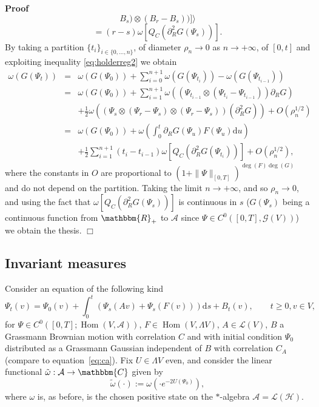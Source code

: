 \documentclass[11pt]{article}
\newcommand{\assign}{:=}
\newcommand{\asterisk}{\mathord{*}}
\newcommand{\mathd}{\mathrm{d}}
\newcommand{\tmop}[1]{\ensuremath{\operatorname{#1}}}
\newenvironment{proof}{\noindent\textbf{Proof\ }}{\hspace*{\fill}$\Box$\medskip}
\begin{document}
\begin{proof}
\[     B_s) \otimes (B_r - B_s))] \rangle \]
  \[ = (r - s) \omega [Q_C (\partial_R^2 G (\Psi_s))] . \]
  By taking a partition $\{ t_i \}_{i \in \{ 0, \ldots, n \}}$, of diameter
  $\rho_n \rightarrow 0$ as $n \rightarrow + \infty$, of $[0, t]$ and
  exploiting inequality {\eqref{eq:holderreg2}} we obtain
  \[ \begin{array}{lll}
       \omega (G (\Psi_t)) & = & \omega (G (\Psi_0)) + \sum_{i = 0}^{n + 1}
       \omega (G (\Psi_{t_i})) - \omega (G (\Psi_{t_{i - 1}}))\\
       & = & \omega (G (\Psi_0)) + \sum_{i = 1}^{n + 1} \omega ((\Psi_{t_{i -
       1}} \otimes (\Psi_{t_i} - \Psi_{t_{i - 1}})) \partial_R G)\\
       &  & + \frac{1}{2} \omega ((\Psi_s \otimes (\Psi_r - \Psi_s) \otimes
       (\Psi_r - \Psi_s)) (\partial_R^2 G)) + O (\rho_n^{1 / 2})\\
       & = & \omega (G (\Psi_0)) + \omega \left( \int_0^t \partial_R G
       (\Psi_u) F (\Psi_u) \mathd u \right)\\
       &  & + \frac{1}{2} \sum_{i = 1}^{n + 1} (t_i - t_{i - 1}) \omega [Q_C
       (\partial_R^2 G (\Psi_{t_i}))] + O (\rho_n^{1 / 2}),
     \end{array} \]
  where the constants in $O$ are proportional to $(1 + \| \Psi \|_{[0,
  T]})^{\deg (F) \deg (G)}$ and do not depend on the partition. Taking the
  limit $n \rightarrow + \infty$, and so $\rho_n \rightarrow 0$, and using the
  fact that $\omega [Q_C (\partial_R^2 G (\Psi_s))]$ is continuous in $s$ ($G
  (\Psi_s)$ being a continuous function from $\mathbbm{R}_+$ to $\mathcal{A}$
  since $\Psi \in C^0 ([0, T], \mathcal{G} (V))$) we obtain the thesis.
\end{proof}

\subsection{Invariant measures}\label{sec:inv-meas}

Consider an equation of the following kind
\begin{equation}
  \Psi_t (v) = \Psi_0 (v) + \int_0^t (\Psi_s (A v) + \Psi_s (F (v))) \mathd s
  + B_t (v), \qquad t \geqslant 0, v \in V, \label{eq:sde-langevin-0}
\end{equation}
for $\Psi \in C^0 ([0, T] ; \tmop{Hom} (V, \mathcal{A}))$, $F \in \tmop{Hom}
(V, \Lambda V)$, $A \in \mathcal{L} (V)$, $B$ a Grassmann Brownian motion with
correlation $C$ and with initial condition $\Psi_0$ distributed as a Grassmann
Gaussian independent of $B$ with correlation $C_A$ (compare to
equation~{\eqref{eq:ca}}). Fix $U \in \Lambda V$ even, and consider the linear
functional $\tilde{\omega} : \mathcal{A} \rightarrow \mathbbm{C}$ given by
\begin{equation}
  \tilde{\omega} (\cdot) \assign \omega (\cdot e^{- 2 U (\Psi_0)}),
  \label{eq:gibbs-U}
\end{equation}
where $\omega$ is, as before, is the chosen positive state on the
$\asterisk$-algebra $\mathcal{A} = \mathcal{L} (\mathcal{H})$.
\end{document}
